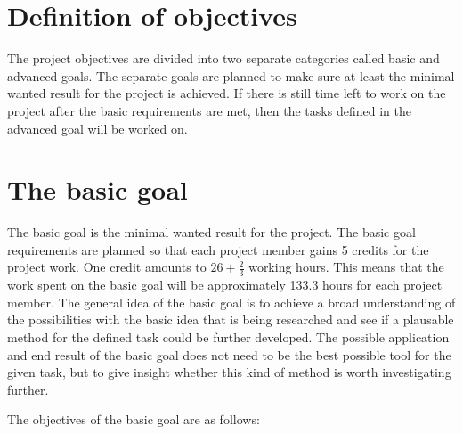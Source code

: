 \section{Definition of objectives}


The project objectives are divided into two separate categories called basic and advanced goals. The separate goals are planned to make sure at least the minimal wanted result for the project is achieved. If there is still time left to work on the project after the basic requirements are met, then the tasks defined in the advanced goal will be worked on.

\section{The basic goal}

The basic goal is the minimal wanted result for the project. The basic goal requirements are planned so that each project member gains 5 credits for the project work. One credit amounts to $26+\frac{2}{3}$ working hours. This means that the work spent on the basic goal will be approximately 133.3 hours for each project member. The general idea of the basic goal is to achieve a broad understanding of the possibilities with the basic idea that is being researched and see if a plausable method for the defined task could be further developed. The possible application and end result of the basic goal does not need to be the best possible tool for the given task, but to give insight whether this kind of method is worth investigating further. 

The objectives of the basic goal are as follows:

